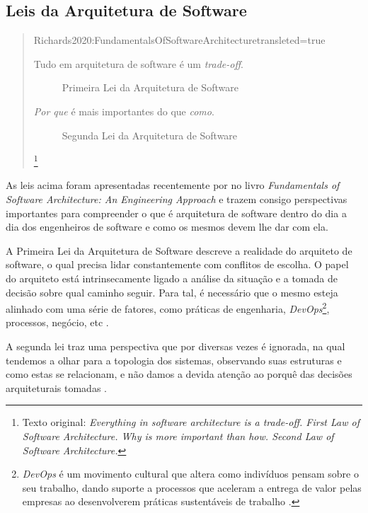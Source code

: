 \subsection{Leis da Arquitetura de Software}
\label{leis}

\begin{quotation}{Richards2020:FundamentalsOfSoftwareArchitecture}{transleted=true}
  \begin{description}
    \item [Tudo em arquitetura de software é um \textit{trade-off}.] Primeira Lei da Arquitetura de
        Software
    \item [\textit{Por que} é mais importantes do que \textit{como}.] Segunda Lei da Arquitetura de Software
  \end{description}\footnote{Texto original: \textit{Everything in software architecture is a trade-off. First Law
    of Software Architecture. Why is more important than how. Second Law of Software Architecture.}}
\end{quotation}

As leis acima foram apresentadas recentemente por 
no livro \textit{Fundamentals of Software Architecture: An Engineering Approach} e trazem consigo
perspectivas importantes para compreender o que é arquitetura de software dentro do dia a dia dos
engenheiros de software e como os mesmos devem lhe dar com ela.

A Primeira Lei da Arquitetura de Software descreve a realidade do arquiteto de
software, o qual precisa lidar constantemente com conflitos de escolha. O papel do arquiteto está
intrinsecamente ligado a análise da situação e a tomada de decisão sobre qual caminho seguir. Para
tal, é necessário que o mesmo esteja alinhado com uma série de fatores, como práticas de engenharia,
\textit{DevOps}\footnote{\textit{DevOps} é um movimento cultural que altera como indivíduos pensam
sobre o seu trabalho, dando suporte a processos que aceleram a entrega de valor pelas empresas ao
desenvolverem práticas sustentáveis de trabalho \cite{davis2016effective}.}, processos, negócio, etc
\cite{Richards2020:FundamentalsOfSoftwareArchitecture}.

A segunda lei traz uma perspectiva que por diversas vezes é ignorada, na qual tendemos a olhar para
a topologia dos sistemas, observando suas estruturas e como estas se relacionam, e não damos a devida
atenção ao porquê das decisões arquiteturais tomadas \cite{Richards2020:FundamentalsOfSoftwareArchitecture}.

